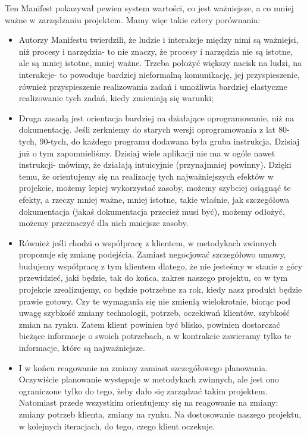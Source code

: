 \newpage

Ten Manifest pokazywał pewien system wartości, co jest ważniejsze, a co mniej ważne w zarządzaniu projektem. Mamy więc takie cztery porównania:

\begin{itemize}
	\item Autorzy Manifestu twierdzili, że ludzie i interakcje między nimi są ważniejsi, niż procesy i narzędzia- to nie znaczy, że procesy i narzędzia nie są istotne, ale są mniej istotne, mniej ważne. Trzeba położyć większy nacisk na ludzi, na interakcje- to powoduje bardziej nieformalną komunikację, jej przyspieszenie, również przyspieszenie realizowania zadań i umożliwia bardziej elastyczne realizowanie tych zadań, kiedy zmieniają się warunki;
	\item Druga zasadą jest orientacja bardziej na działające oprogramowanie, niż na dokumentację. Jeśli zerkniemy do starych wersji oprogramowania z lat 80-tych, 90-tych, do każdego programu dodawana była gruba instrukcja. Dzisiaj już o tym zapomnieliśmy. Dzisiaj wiele aplikacji nie ma w ogóle nawet instrukcji- mówimy, że działają intuicyjnie (przynajmniej powinny). Dzięki temu, że orientujemy się na realizację tych najważniejszych efektów w projekcie, możemy lepiej wykorzystać zasoby, możemy szybciej osiągnąć te efekty, a rzeczy mniej ważne, mniej istotne, takie właśnie, jak szczegółowa dokumentacja (jakaś dokumentacja przecież musi być), możemy odłożyć, możemy przeznaczyć dla nich mniejsze zasoby.
	\item Również jeśli chodzi o współpracę z klientem, w metodykach zwinnych proponuje się zmianę podejścia. Zamiast negocjować szczegółowo umowy, budujemy współpracę z tym klientem dlatego, że nie jesteśmy w stanie z góry przewidzieć, jaki będzie, tak do końca, zakres naszego projektu, co w tym projekcie zrealizujemy, co będzie potrzebne za rok, kiedy nasz produkt będzie prawie gotowy. Czy te wymagania się nie zmienią wielokrotnie, biorąc pod uwagę szybkość zmiany technologii, potrzeb, oczekiwań klientów, szybkość zmian na rynku. Zatem klient powinien być blisko, powinien dostarczać bieżące informacje o swoich potrzebach, a w kontrakcie zawieramy tylko te informacje, które są najważniejsze.
	\item I w końcu reagowanie na zmiany zamiast szczegółowego planowania.
	Oczywiście planowanie występuje w metodykach zwinnych, ale jest ono ograniczone tylko do tego, żeby dało się zarządzać takim projektem. Natomiast przede wszystkim orientujemy się na reagowanie na zmiany: zmiany potrzeb klienta, zmiany na rynku. Na dostosowanie naszego projektu, w kolejnych iteracjach, do tego, czego klient oczekuje.
\end{itemize}

